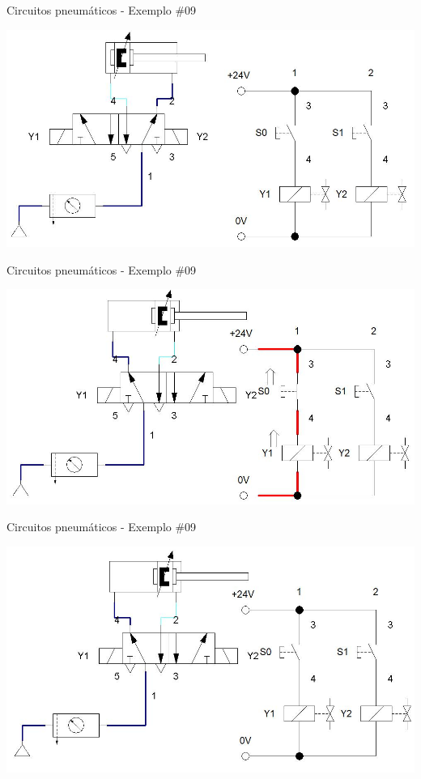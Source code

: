 \begin{frame}{Circuitos pneumáticos - Exemplo \#09}
	
	\medskip
	\centering
	
	\includegraphics[height=0.8\textheight]{Figuras/Ch14/fig51}
	
\end{frame}


\begin{frame}{Circuitos pneumáticos - Exemplo \#09}
	
	\centering
	\includegraphics[height=0.8\textheight]{Figuras/Ch14/fig51n2}
	
\end{frame}


\begin{frame}{Circuitos pneumáticos - Exemplo \#09}
	
	\centering
	\includegraphics[height=0.8\textheight]{Figuras/Ch14/fig51n3}
	
\end{frame}


